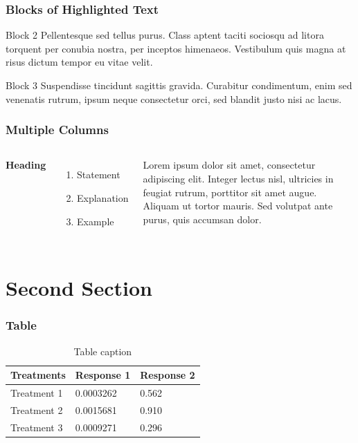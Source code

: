 \documentclass{beamer}
\begin{document}
\begin{frame}
\frametitle{Blocks of Highlighted Text}


\begin{block}{Block 2}
Pellentesque sed tellus purus. Class aptent taciti sociosqu ad litora torquent per conubia nostra, per inceptos himenaeos. Vestibulum quis magna at risus dictum tempor eu vitae velit.
\end{block}

\begin{block}{Block 3}
Suspendisse tincidunt sagittis gravida. Curabitur condimentum, enim sed venenatis rutrum, ipsum neque consectetur orci, sed blandit justo nisi ac lacus.
\end{block}
\end{frame}


\begin{frame}
\frametitle{Multiple Columns}
\begin{columns}[c] %

\textbf{Heading}
\begin{enumerate}
\item Statement
\item Explanation
\item Example
\end{enumerate}

Lorem ipsum dolor sit amet, consectetur adipiscing elit. Integer lectus nisl, ultricies in feugiat rutrum, porttitor sit amet augue. Aliquam ut tortor mauris. Sed volutpat ante purus, quis accumsan dolor.

\end{columns}
\end{frame}

\section{Second Section}

\begin{frame}
\frametitle{Table}
\begin{table}
\begin{tabular}{l l l}
\toprule
\textbf{Treatments} & \textbf{Response 1} & \textbf{Response 2}\\
\midrule
Treatment 1 & 0.0003262 & 0.562 \\
Treatment 2 & 0.0015681 & 0.910 \\
Treatment 3 & 0.0009271 & 0.296 \\
\bottomrule
\end{tabular}
\caption{Table caption}
\end{table}
\end{frame}
\end{document}
